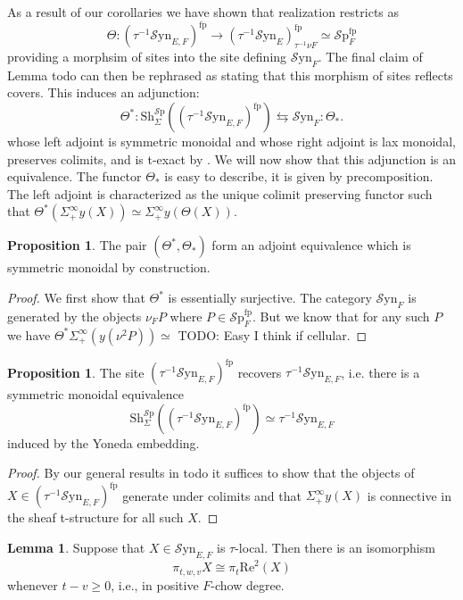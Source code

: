 \documentclass[10pt]{amsart}
\theoremstyle{definition}
\numberwithin{figure}{section}
\numberwithin{equation}{section}
\newtheorem{lemma}[figure]{Lemma}
\newtheorem{proposition}[figure]{Proposition}
\theoremstyle{cited}
\newcommand{\Sp}{{\mathcal{S}\mathrm{p}}}
\newcommand{\Sh}{\mathrm{Sh}}
\newcommand{\fp}{\mathrm{fp}}
\newcommand{\Syn}{\mathcal{S}\mathrm{yn}}
\renewcommand{\Re}{\mathrm{Re}}
\begin{document}
As a result of our corollaries we have shown that realization restricts as
\[
\Theta:(\tau^{-1}\Syn_{E,F})^\fp \to (\tau^{-1}\Syn_E)^\fp_{\tau^{-1}\nu F}\simeq \Sp^\fp_F
\]
providing a morphsim of sites into the site defining $\Syn_F$. The final claim of Lemma todo can then be rephrased as stating that this morphism of sites reflects covers. This induces an adjunction:
\[
\Theta^*: \Sh^\Sp_\Sigma((\tau^{-1}\Syn_{E,F})^\fp) \leftrightarrows \Syn_F:\Theta_*.
\]
whose left adjoint is symmetric monoidal and whose right adjoint is lax monoidal, preserves colimits, and is t-exact by \cite[Prop. 2.22, Rem. 2.23]{Pst22}. We will now show that this adjunction is an equivalence. The functor $\Theta_*$ is easy to describe, it is given by precomposition. The left adjoint is characterized as the unique colimit preserving functor such that $\Theta^*(\Sigma^\infty_+y(X))\simeq \Sigma_+^\infty y(\Theta(X))$.

\begin{proposition}
  The pair $(\Theta^*,\Theta_*)$ form an adjoint equivalence which is symmetric monoidal by construction.
\end{proposition}

\begin{proof}
  We first show that $\Theta^*$ is essentially surjective. The category $\Syn_F$ is generated by the objects $\nu_F P$ where $P\in \Sp^\fp_F$. But we know that for any such $P$ we have $\Theta^*\Sigma^\infty_+(y(\nu^2P))\simeq $ TODO: Easy I think if cellular.
\end{proof}

\begin{proposition}
  The site $(\tau^{-1}\Syn_{E,F})^\fp$ recovers $\tau^{-1}\Syn_{E,F}$, i.e. there is a symmetric monoidal equivalence 
  \[
    \Sh_\Sigma^\Sp((\tau^{-1}\Syn_{E,F})^\fp) \simeq \tau^{-1}\Syn_{E,F}
  \]
  induced by the Yoneda embedding.
\end{proposition}

\begin{proof}
  By our general results in todo it suffices to show that the objects of $X\in (\tau^{-1}\Syn_{E,F})^\fp$ generate under colimits and that $\Sigma^\infty_+y(X)$ is connective in the sheaf t-structure for all such $X$.
\end{proof}

\newpage

\begin{lemma}
  Suppose that $X\in \Syn_{E,F}$ is $\tau$-local. Then there is an isomorphism
  \[
    \pi_{t,w,v}X \cong \pi_{t}\Re^2(X)
  \]
  whenever $t-v\geq 0$, i.e., in positive $F$-chow degree.
\end{lemma}
\end{document}
